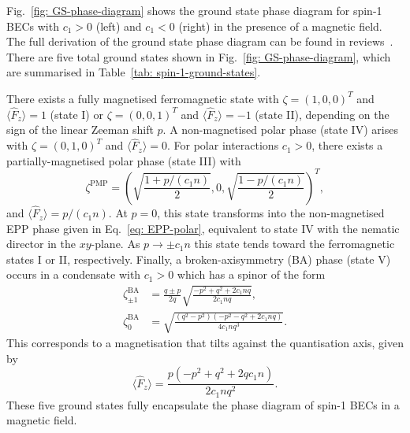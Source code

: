 Fig.~\ref{fig: GS-phase-diagram} shows the ground state phase diagram for spin-1
BECs with \(c_1 > 0\) (left) and \(c_1 < 0\) (right) in the presence of a
magnetic field.
The full derivation of the ground state phase diagram can be found in
reviews~\cite{Kawaguchi2012, Stamper-Kurn2013}.
There are five total ground states shown in Fig.~\ref{fig: GS-phase-diagram},
which are summarised in Table~\ref{tab: spin-1-ground-states}.

There exists a fully magnetised ferromagnetic state with \(\zeta={(1, 0, 0)}^T\)
and \(\langle\hat{F}_z\rangle=1\) (state I) or \(\zeta={(0, 0, 1)}^T\) and
\(\langle\hat{F}_z\rangle=-1\) (state II), depending on the sign of the linear
Zeeman shift \(p\).
A non-magnetised polar phase (state IV) arises with \(\zeta={(0, 1, 0)}^T\) and
\(\langle\hat{F}_z\rangle = 0\).
For polar interactions \(c_1 > 0\), there exists a partially-magnetised polar
phase (state III) with
\begin{equation}\label{eq: AFM-spinor}
    \zeta^\mathrm{PMP} = {\left(\sqrt{\frac{1 + p/(c_1n)}{2}}, 0,
    \sqrt{\frac{1 - p/(c_1n)}{2}}\right)}^T,
\end{equation}
and \(\langle\hat{F}_z\rangle = p/(c_1n)\).
At \(p=0\), this state transforms into the non-magnetised EPP phase given in
Eq.~\eqref{eq: EPP-polar}, equivalent to state IV with the nematic director in
the \(xy\)-plane.
As \(p \rightarrow \pm c_1n\) this state tends toward the ferromagnetic states
I or II, respectively.
Finally, a broken-axisymmetry (BA) phase (state V) occurs in a condensate with
\(c_1 > 0\) which has a spinor of the form
\begin{equation}
    \begin{aligned}
        \zeta^\text{BA}_{\pm 1} & =
        \frac{q \pm p}{2q}\sqrt{\frac{-p^2+q^2+2c_1nq}{2c_1nq}}, \\
        \zeta_0^\text{BA} & = \sqrt{\frac{(q^2-p^2)(-p^2-q^2+2c_1nq)}{4c_1nq^3}}.
    \end{aligned}
    \label{eq: BA-spinor}
\end{equation}
This corresponds to a magnetisation that tilts against the quantisation axis,
given by
\begin{equation}
    \langle\hat{F}_z\rangle = \frac{p(-p^2 + q^2 + 2qc_1n)}{2c_1nq^2}.
\end{equation}
These five ground states fully encapsulate the phase diagram of spin-1 BECs
in a magnetic field.

